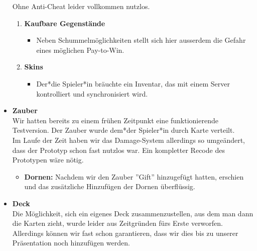 \begin{itemize}
    Ohne Anti-Cheat leider vollkommen nutzlos.
    \begin{enumerate}
        \item \textbf{Kaufbare Gegenstände}
        \begin{itemize}
            \item Neben Schummelmöglichkeiten stellt sich hier ausserdem die Gefahr eines möglichen Pay-to-Win.
        \end{itemize}
        \item \textbf{Skins}
        \begin{itemize}
            \item Der*die Spieler*in bräuchte ein Inventar, das mit einem Server kontrolliert und synchronisiert wird. 
        \end{itemize}
    \end{enumerate}
    \item \textbf{Zauber} \\
        Wir hatten bereits zu einem frühen Zeitpunkt eine funktionierende Testversion. Der Zauber wurde dem*der Spieler*in durch Karte verteilt. \\
        Im Laufe der Zeit haben wir das Damage-System allerdings so umgeändert, dass der Prototyp schon fast nutzlos war. Ein kompletter Recode des Prototypen wäre nötig.
    \begin{itemize}
        \item \textbf{Dornen:}
            Nachdem wir den Zauber ''Gift'' hinzugefügt hatten, erschien und das zusätzliche Hinzufügen der Dornen überflüssig.
    \end{itemize}
    \item \textbf{Deck} \\
        Die Möglichkeit, sich ein eigenes Deck zusammenzustellen, aus dem man dann die Karten zieht, wurde leider aus Zeitgründen fürs Erste verworfen. Allerdings können wir
        fast schon garantieren, dass wir dies bis zu unserer Präsentation noch hinzufügen werden.     
\end{itemize}